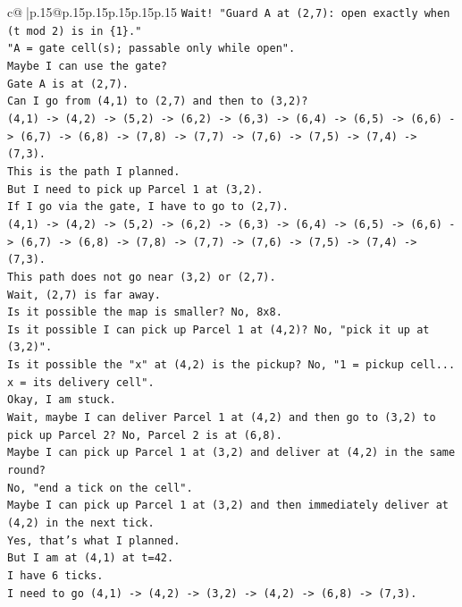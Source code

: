 \documentclass{article}
\begin{document}
{\begin{supertabular}{c@{$\;$}|p{.15\linewidth}@{}p{.15\linewidth}p{.15\linewidth}p{.15\linewidth}p{.15\linewidth}p{.15\linewidth}}
{{{\texttt{Wait! "Guard A at (2,7): open exactly when (t mod 2) is in \{1\}."} \\
\texttt{"A = gate cell(s); passable only while open".} \\
\texttt{Maybe I can use the gate?} \\
\texttt{Gate A is at (2,7).} \\
\texttt{Can I go from (4,1) to (2,7) and then to (3,2)?} \\
\texttt{(4,1) {-}> (4,2) {-}> (5,2) {-}> (6,2) {-}> (6,3) {-}> (6,4) {-}> (6,5) {-}> (6,6) {-}> (6,7) {-}> (6,8) {-}> (7,8) {-}> (7,7) {-}> (7,6) {-}> (7,5) {-}> (7,4) {-}> (7,3).} \\
\texttt{This is the path I planned.} \\
\texttt{But I need to pick up Parcel 1 at (3,2).} \\
\texttt{If I go via the gate, I have to go to (2,7).} \\
\texttt{(4,1) {-}> (4,2) {-}> (5,2) {-}> (6,2) {-}> (6,3) {-}> (6,4) {-}> (6,5) {-}> (6,6) {-}> (6,7) {-}> (6,8) {-}> (7,8) {-}> (7,7) {-}> (7,6) {-}> (7,5) {-}> (7,4) {-}> (7,3).} \\
\texttt{This path does not go near (3,2) or (2,7).} \\
\texttt{Wait, (2,7) is far away.} \\
\texttt{Is it possible the map is smaller? No, 8x8.} \\
\texttt{Is it possible I can pick up Parcel 1 at (4,2)? No, "pick it up at (3,2)".} \\
\texttt{Is it possible the "x" at (4,2) is the pickup? No, "1 = pickup cell... x = its delivery cell".} \\
\texttt{Okay, I am stuck.} \\
\texttt{Wait, maybe I can deliver Parcel 1 at (4,2) and then go to (3,2) to pick up Parcel 2? No, Parcel 2 is at (6,8).} \\
\texttt{Maybe I can pick up Parcel 1 at (3,2) and deliver at (4,2) in the same round?} \\
\texttt{No, "end a tick on the cell".} \\
\texttt{Maybe I can pick up Parcel 1 at (3,2) and then immediately deliver at (4,2) in the next tick.} \\
\texttt{Yes, that's what I planned.} \\
\texttt{But I am at (4,1) at t=42.} \\
\texttt{I have 6 ticks.} \\
\texttt{I need to go (4,1) {-}> (4,2) {-}> (3,2) {-}> (4,2) {-}> (6,8) {-}> (7,3).} \\
}}}
\end{supertabular}}
\end{document}
